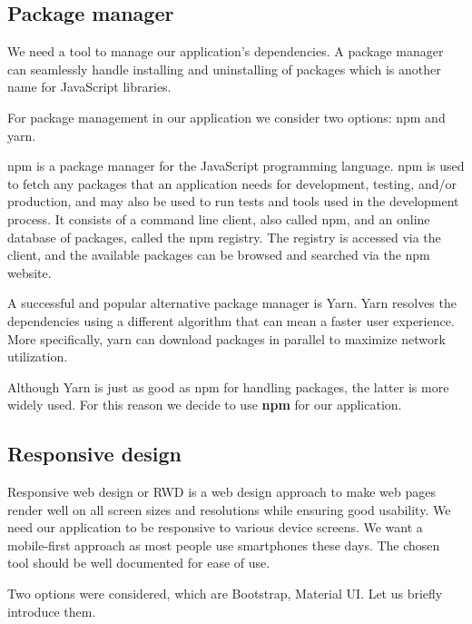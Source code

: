 
\subsection*{Package manager}
  We need a tool to manage our application's dependencies.
  A package manager can seamlessly handle installing and uninstalling of packages which is another name for JavaScript libraries.

  For package management in our application we consider two options: npm and yarn.

  npm is a package manager for the JavaScript programming language.
  npm is used to fetch any packages that an application needs for development, testing, and/or production, and may also be used to run tests and tools used in the development process.
  It consists of a command line client, also called npm, and an online database of packages, called the npm registry. 
  The registry is accessed via the client, and the available packages can be browsed and searched via the npm website.

  A successful and popular alternative package manager is Yarn. 
  Yarn resolves the dependencies using a different algorithm that can mean a faster user experience.
  More specifically, yarn can download packages in parallel to maximize network utilization.

  Although Yarn is just as good as npm for handling packages, the latter is more widely used.
  For this reason we decide to use \textbf{npm} for our application. 

\subsection*{Responsive design}
  Responsive web design or RWD is a web design approach to make web pages render well on all screen sizes and resolutions while ensuring good usability.
  We need our application to be responsive to various device screens.
  We want a mobile-first approach as most people use smartphones these days.
  The chosen tool should be well documented for ease of use.

  Two options were considered, which are Bootstrap, Material UI.
  Let us briefly introduce them.


